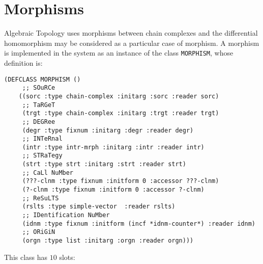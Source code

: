 \newpage

\section {Morphisms}

Algebraic  Topology uses  morphisms between chain complexes and
the dif\-fe\-ren\-ti\-al homomorphism may be considered as a particular
case of  morphism. A morphism is implemented in the system as an instance
of the class {\tt MORPHISM}, whose definition is:
{\footnotesize\begin{verbatim}
(DEFCLASS MORPHISM ()
     ;; SOuRCe
    ((sorc :type chain-complex :initarg :sorc :reader sorc)
     ;; TaRGeT
     (trgt :type chain-complex :initarg :trgt :reader trgt)
     ;; DEGRee
     (degr :type fixnum :initarg :degr :reader degr)
     ;; INTeRnal
     (intr :type intr-mrph :initarg :intr :reader intr)
     ;; STRaTegy
     (strt :type strt :initarg :strt :reader strt)
     ;; CaLl NuMber
     (???-clnm :type fixnum :initform 0 :accessor ???-clnm)
     (?-clnm :type fixnum :initform 0 :accessor ?-clnm)
     ;; ReSuLTS
     (rslts :type simple-vector  :reader rslts)
     ;; IDentification NuMber
     (idnm :type fixnum :initform (incf *idnm-counter*) :reader idnm)
     ;; ORiGiN
     (orgn :type list :initarg :orgn :reader orgn)))
\end{verbatim}}
This class has $10$ slots:

